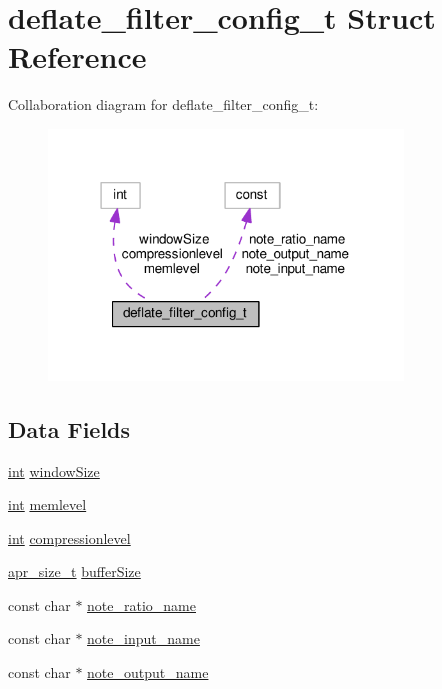 \hypertarget{structdeflate__filter__config__t}{}\section{deflate\+\_\+filter\+\_\+config\+\_\+t Struct Reference}
\label{structdeflate__filter__config__t}


Collaboration diagram for deflate\+\_\+filter\+\_\+config\+\_\+t\+:
\nopagebreak
\begin{figure}[H]
\begin{center}
\leavevmode
\includegraphics[width=267pt]{structdeflate__filter__config__t__coll__graph}
\end{center}
\end{figure}
\subsection*{Data Fields}
\begin{DoxyCompactItemize}
\item 
\hyperlink{pcre_8txt_a42dfa4ff673c82d8efe7144098fbc198}{int} \hyperlink{structdeflate__filter__config__t_a7792c409d3cbcd653e97ce1c9a001a69}{window\+Size}
\item 
\hyperlink{pcre_8txt_a42dfa4ff673c82d8efe7144098fbc198}{int} \hyperlink{structdeflate__filter__config__t_a1a686d309b73b8af68a3c139b138ad01}{memlevel}
\item 
\hyperlink{pcre_8txt_a42dfa4ff673c82d8efe7144098fbc198}{int} \hyperlink{structdeflate__filter__config__t_a84a36626ee632c357877e5c81ca0336d}{compressionlevel}
\item 
\hyperlink{group__apr__platform_gaaa72b2253f6f3032cefea5712a27540e}{apr\+\_\+size\+\_\+t} \hyperlink{structdeflate__filter__config__t_a36cf5c02154d9aa87f8bae307c624d7b}{buffer\+Size}
\item 
const char $\ast$ \hyperlink{structdeflate__filter__config__t_aadd3936bb91c587fbb3629459d7ea587}{note\+\_\+ratio\+\_\+name}
\item 
const char $\ast$ \hyperlink{structdeflate__filter__config__t_a42fe3bd994c2265abe711b06fdb674a4}{note\+\_\+input\+\_\+name}
\item 
const char $\ast$ \hyperlink{structdeflate__filter__config__t_ac185f14d2bf7cf7ef077a687bb07cf8a}{note\+\_\+output\+\_\+name}
\end{DoxyCompactItemize}


